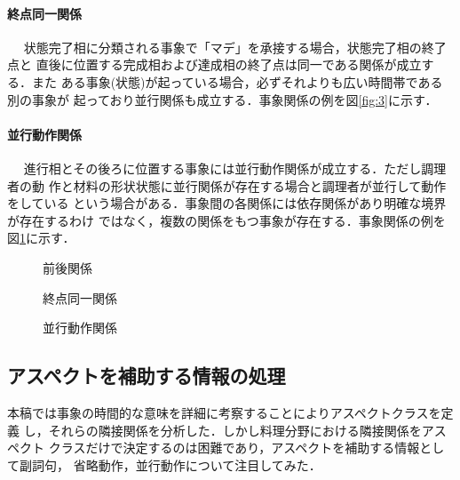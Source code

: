 \paragraph{終点同一関係}~~
 状態完了相に分類される事象で「マデ」を承接する場合，状態完了相の終了点と
 直後に位置する完成相および達成相の終了点は同一である関係が成立する．また
 ある事象(状態)が起っている場合，必ずそれよりも広い時間帯である別の事象が
 起っており並行関係も成立する．事象関係の例を図\ref{fig:3}に示す．

\paragraph{並行動作関係}~~
進行相とその後ろに位置する事象には並行動作関係が成立する．ただし調理者の動
作と材料の形状状態に並行関係が存在する場合と調理者が並行して動作をしている
という場合がある．事象間の各関係には依存関係があり明確な境界が存在するわけ
ではなく，複数の関係をもつ事象が存在する．事象関係の例を図\ref{fig:4}に示す．

\begin{figure}[htbp]
\begin{center}
 \begin{minipage}{0.32\textwidth}
 \begin{center}
  \caption{前後関係}\label{fig:2}
 \end{center}
 \end{minipage}
 \begin{minipage}{0.32\textwidth} 
 \begin{center}
   \caption{終点同一関係}\label{fig:3}
 \end{center}
 \end{minipage}
 \begin{minipage}{0.33\textwidth}
 \begin{center}
  \caption{並行動作関係}\label{fig:4}
 \end{center}
 \end{minipage}
\end{center}
\end{figure}


\subsection{アスペクトを補助する情報の処理}

本稿では事象の時間的な意味を詳細に考察することによりアスペクトクラスを定義
し，それらの隣接関係を分析した．しかし料理分野における隣接関係をアスペクト
クラスだけで決定するのは困難であり，アスペクトを補助する情報として副詞句，
省略動作，並行動作について注目してみた．

